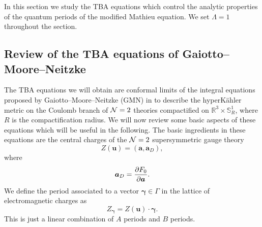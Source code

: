 \documentclass[a4paper,11pt]{article}
\theoremstyle{definition}
\newcommand{\CN}{{\cal N}}
\def\IR{{\mathbb R}}
\def\IS{{\mathbb S}}
\newcommand{\bs}{\boldsymbol}
\def\IR{\mathbb{R}}
\begin{document}
In this section we study the TBA equations which control the analytic
properties of the quantum periods of the modified Mathieu equation. We set
$\Lambda=1$ throughout the section.

\subsection{Review of the TBA equations of Gaiotto--Moore--Neitzke}

The TBA equations we will obtain are conformal limits \cite{oper} of
the integral equations proposed by Gaiotto--Moore--Neitzke (GMN) in
\cite{gmn} to describe the hyperK\"ahler metric on the Coulomb branch
of $\CN=2$ theories compactified on $\IR^3 \times \IS^1_R$, where $R$
is the compactification radius. We will now review some basic aspects
of these equations which will be useful in the following.  The basic
ingredients in these equations are the central charges of the $\CN=2$
supersymmetric gauge theory
\begin{equation}
  Z(\bs{u})=\left(\bs{a},  \bs{a}_D \right), 
\end{equation}
%
where
%
\begin{equation}
  \bs{a}_D={\partial F_0 \over \partial \bs{a}}. 
\end{equation}
%
We define the period associated to a vector
$\bs{\gamma}\in\Gamma$ in the lattice of electromagnetic charges as
%
\begin{equation}
  Z_{\bs{\gamma}}= Z(\bs{u}) \cdot {\boldsymbol{\gamma}}.
\end{equation}
%
This is just a linear combination of $A$ periods and $B$ periods. 
\end{document}
